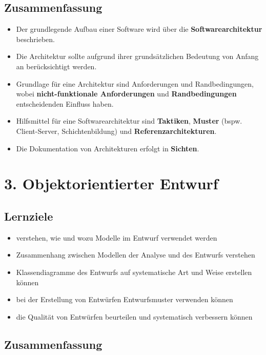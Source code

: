\subsection*{Zusammenfassung}

\begin{itemize}
    \item Der grundlegende Aufbau einer Software wird über die \textbf{Softwarearchitektur} beschrieben.
    \item Die Architektur sollte aufgrund ihrer grundsätzlichen Bedeutung von Anfang an berücksichtigt werden.
    \item Grundlage für eine Architektur sind Anforderungen und Randbedingungen, wobei \textbf{nicht-funktionale Anforderungen} und \textbf{Randbedingungen} entscheidenden Einfluss haben.
    \item Hilfsmittel für eine Softwarearchitektur sind \textbf{Taktiken}, \textbf{Muster} (bspw. Client-Server, Schichtenbildung) und \textbf{Referenzarchitekturen}.
    \item Die Dokumentation von Architekturen erfolgt in \textbf{Sichten}.
\end{itemize}

\section*{3. Objektorientierter Entwurf}

\subsection*{Lernziele}
\begin{itemize}
    \item verstehen, wie und wozu Modelle im Entwurf verwendet werden
    \item Zusammenhang zwischen Modellen der Analyse und des Entwurfs verstehen
    \item Klassendiagramme des Entwurfs auf systematische Art und Weise erstellen können
    \item bei der Erstellung von Entwürfen Entwurfsmuster verwenden können
    \item die Qualität von Entwürfen beurteilen und systematisch verbessern können
\end{itemize}

\subsection*{Zusammenfassung}

